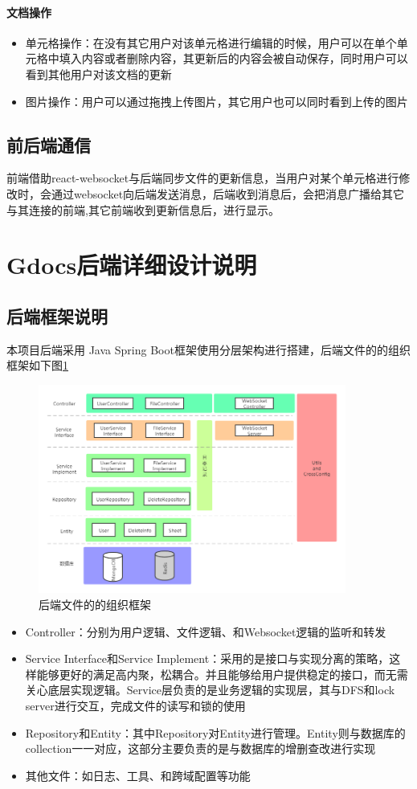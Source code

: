 \documentclass[UTF8]{ctexart}
\begin{document}
\paragraph{文档操作}
\begin{itemize}
\item 单元格操作：在没有其它用户对该单元格进行编辑的时候，用户可以在单个单元格中填入内容或者删除内容，其更新后的内容会被自动保存，同时用户可以看到其他用户对该文档的更新
\item 图片操作：用户可以通过拖拽上传图片，其它用户也可以同时看到上传的图片
\end{itemize}
\subsection{前后端通信}
\par 前端借助react-websocket与后端同步文件的更新信息，当用户对某个单元格进行修改时，会通过websocket向后端发送消息，后端收到消息后，会把消息广播给其它与其连接的前端,其它前端收到更新信息后，进行显示。
\section{Gdocs后端详细设计说明}

\subsection{后端框架说明}
\par 本项目后端采用 Java Spring Boot框架使用分层架构进行搭建，后端文件的的组织框架如下图\ref{fig:后端框架}
\begin{figure}[h]
    \centering
    \includegraphics[width=0.9\textwidth, height=0.6\textwidth]{be1.png}
	\caption{后端文件的的组织框架}
	\label{fig:后端框架}
\end{figure}
\begin{itemize}
\item Controller：分别为用户逻辑、文件逻辑、和Websocket逻辑的监听和转发
\item Service Interface和Service Implement：采用的是接口与实现分离的策略，这样能够更好的满足高内聚，松耦合。并且能够给用户提供稳定的接口，而无需关心底层实现逻辑。Service层负责的是业务逻辑的实现层，其与DFS和lock server进行交互，完成文件的读写和锁的使用
\item Repository和Entity：其中Repository对Entity进行管理。Entity则与数据库的collection一一对应，这部分主要负责的是与数据库的增删查改进行实现
\item 其他文件：如日志、工具、和跨域配置等功能
\end{itemize}
\end{document}
